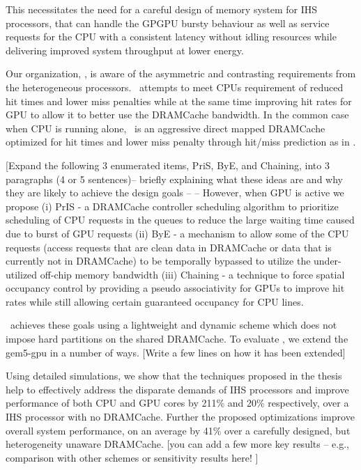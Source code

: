 This necessitates the need for a careful design of memory system for IHS processors, that can handle the GPGPU bursty behaviour as well as service requests for the CPU with a consistent latency without idling resources while delivering improved system throughput at lower energy.
\par Our organization, \cachename, is aware of the asymmetric and contrasting requirements from the heterogeneous processors. \cachename\ attempts to meet CPUs requirement of reduced hit times and lower miss penalties while at the same time improving hit rates for GPU to allow it to better use the DRAMCache bandwidth. In the common case when CPU is running alone, \cachename\ is an aggressive direct mapped DRAMCache optimized for hit times and lower miss penalty through hit/miss prediction as in \cite{alloy}. 

[Expand the following 3 enumerated items, PriS, ByE, and Chaining, into 3
paragraphs (4 or 5 sentences)-- briefly explaining what these ideas are
and why they are likely to achieve the design goals --
--
However, when GPU is active we propose (i) PrIS - a DRAMCache controller
scheduling algorithm to prioritize scheduling of CPU requests in the
queues to reduce the large waiting time caused due to burst of GPU
requests (ii) ByE - a mechanism to allow some of the CPU requests (access
requests that are clean data in DRAMCache or data that is currently not in
DRAMCache) to be temporally bypassed to utilize the under-utilized
off-chip memory bandwidth (iii) Chaining - a technique to force spatial
occupancy control by providing a pseudo associativity for GPUs to improve
hit rates while still allowing certain guaranteed occupancy for CPU lines.

\cachename\ achieves these goals using a lightweight and dynamic scheme which does not impose hard partitions on the shared DRAMCache. To evaluate
\cachename, we extend the gem5-gpu \cite{gem5-gpu} in a number of ways.  [Write a
few lines on how it has been extended]

Using detailed simulations, we show that the techniques proposed in the thesis  help to effectively address the disparate demands of IHS
processors and improve performance of both CPU and GPU cores by 211\% and 20\% respectively, over a IHS processor with no DRAMCache.  Further the proposed optimizations improve overall system performance, on an average by 41\% over a carefully designed, but heterogeneity unaware DRAMCache.  
[you can add a few more key results -- e.g., comparison with other schemes
or sensitivity results here! ]

